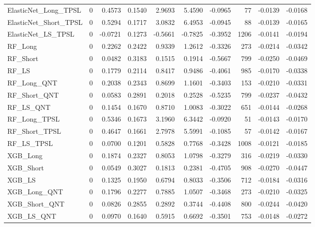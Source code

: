 \begin{tabular}{llrrrrrrrr}
\cline{1-10}
ElasticNet\_Long\_TPSL & 0 & 0.4573 & 0.1540 & 2.9693 & 5.4590 & -0.0965 & 77 & -0.0139 & -0.0168 \\
\cline{1-10}
ElasticNet\_Short\_TPSL & 0 & 0.5294 & 0.1717 & 3.0832 & 6.4953 & -0.0945 & 88 & -0.0139 & -0.0165 \\
\cline{1-10}
ElasticNet\_LS\_TPSL & 0 & -0.0721 & 0.1273 & -0.5661 & -0.7825 & -0.3952 & 1206 & -0.0141 & -0.0194 \\
\cline{1-10}
RF\_Long & 0 & 0.2262 & 0.2422 & 0.9339 & 1.2612 & -0.3326 & 273 & -0.0214 & -0.0342 \\
\cline{1-10}
RF\_Short & 0 & 0.0482 & 0.3183 & 0.1515 & 0.1914 & -0.5667 & 799 & -0.0250 & -0.0469 \\
\cline{1-10}
RF\_LS & 0 & 0.1779 & 0.2114 & 0.8417 & 0.9486 & -0.4061 & 985 & -0.0170 & -0.0338 \\
\cline{1-10}
RF\_Long\_QNT & 0 & 0.2038 & 0.2343 & 0.8699 & 1.1601 & -0.3403 & 153 & -0.0210 & -0.0331 \\
\cline{1-10}
RF\_Short\_QNT & 0 & 0.0583 & 0.2891 & 0.2018 & 0.2528 & -0.5235 & 799 & -0.0237 & -0.0432 \\
\cline{1-10}
RF\_LS\_QNT & 0 & 0.1454 & 0.1670 & 0.8710 & 1.0083 & -0.3022 & 651 & -0.0144 & -0.0268 \\
\cline{1-10}
RF\_Long\_TPSL & 0 & 0.5346 & 0.1673 & 3.1960 & 6.3442 & -0.0920 & 51 & -0.0143 & -0.0170 \\
\cline{1-10}
RF\_Short\_TPSL & 0 & 0.4647 & 0.1661 & 2.7978 & 5.5991 & -0.1085 & 57 & -0.0142 & -0.0167 \\
\cline{1-10}
RF\_LS\_TPSL & 0 & 0.0700 & 0.1201 & 0.5828 & 0.7768 & -0.3428 & 1008 & -0.0121 & -0.0185 \\
\cline{1-10}
XGB\_Long & 0 & 0.1874 & 0.2327 & 0.8053 & 1.0798 & -0.3279 & 316 & -0.0219 & -0.0330 \\
\cline{1-10}
XGB\_Short & 0 & 0.0549 & 0.3027 & 0.1813 & 0.2381 & -0.4705 & 908 & -0.0270 & -0.0447 \\
\cline{1-10}
XGB\_LS & 0 & 0.1325 & 0.1950 & 0.6794 & 0.8033 & -0.3506 & 712 & -0.0184 & -0.0316 \\
\cline{1-10}
XGB\_Long\_QNT & 0 & 0.1796 & 0.2277 & 0.7885 & 1.0507 & -0.3468 & 273 & -0.0210 & -0.0325 \\
\cline{1-10}
XGB\_Short\_QNT & 0 & 0.0826 & 0.2855 & 0.2892 & 0.3744 & -0.4408 & 800 & -0.0244 & -0.0420 \\
\cline{1-10}
XGB\_LS\_QNT & 0 & 0.0970 & 0.1640 & 0.5915 & 0.6692 & -0.3501 & 753 & -0.0148 & -0.0272 \\

\end{tabular}
